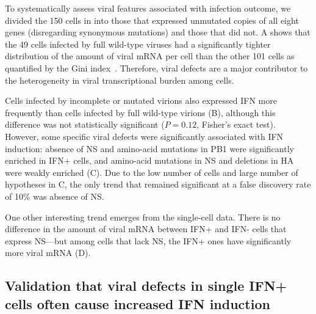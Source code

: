 \documentclass[9pt,lineno]{elife}
\begin{document}
\begin{figure}
\begin{fullwidth}
\label{figdata:mutations}

\end{fullwidth}
\end{figure}

To systematically assess viral features associated with infection outcome, we divided the 150 cells in  into those that expressed unmutated copies of all eight genes (disregarding synonymous mutations) and those that did not.
A shows that the 49 cells infected by full wild-type viruses had a significantly tighter distribution of the amount of viral mRNA per cell than the other 101 cells as quantified by the Gini index~\citep{gini1921measurement}.
Therefore, viral defects are a major contributor to the heterogeneity in viral transcriptional burden among cells.

Cells infected by incomplete or mutated virions also expressed IFN more frequently than cells infected by full wild-type virions (B), although this difference was not statistically significant ($P = 0.12$, Fisher's exact test).
However, some specific viral defects were significantly associated with IFN induction: absence of NS and amino-acid mutations in PB1 were significantly enriched in IFN+ cells, and amino-acid mutations in NS and deletions in HA were weakly enriched (C).
Due to the low number of cells and large number of hypotheses in C, the only trend that remained significant at a false discovery rate of 10\% was absence of NS.

One other interesting trend emerges from the single-cell data.
There is no difference in the amount of viral mRNA between IFN+ and IFN- cells that express NS---but among cells that lack NS, the IFN+ ones have significantly more viral mRNA (D).

\subsection{Validation that viral defects in single IFN+ cells often cause increased IFN induction}
\end{document}
